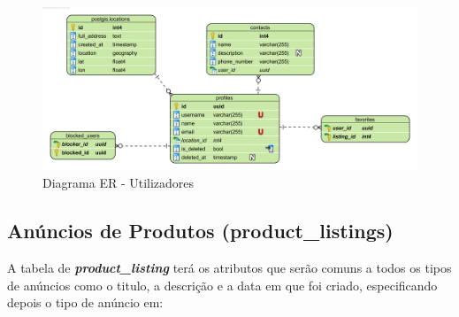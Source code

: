 \documentclass[a4paper, 12pt]{article} %
\begin{document}
\begin{figure}[ht]
	\centering

	\includegraphics[width=\textwidth]{../images/entity-relationship-profiles.png}
	\caption{Diagrama ER - Utilizadores}
	\label{fig:ER Users}
\end{figure}
\newpage
\subsection{\textbf{Anúncios de Produtos (product\_listings)}}

A tabela de \textbf{\textit{product\_listing}} terá os atributos que serão comuns a todos os tipos de anúncios como o titulo, a descrição e a data em que foi criado, especificando depois o tipo de anúncio em:
\end{document}
